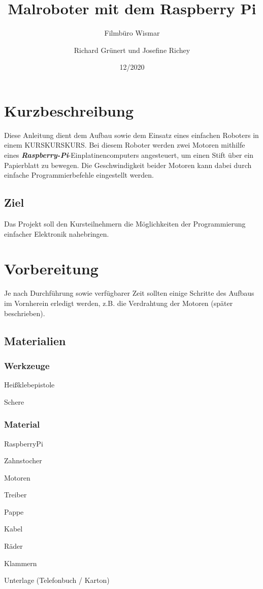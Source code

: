 \documentclass[12pt]{article}
\title{Malroboter mit dem Raspberry Pi}
\subtitle{Filmbüro Wismar}
\author{Richard Grünert und Josefine Richey}
\date{12/2020}
\let\oldemph\emph
\renewcommand{\emph}[1]{\textbf{\oldemph{#1}}}
\begin{document}
\maketitle

\tableofcontents

\pagebreak

\section{Kurzbeschreibung}
Diese Anleitung dient dem Aufbau sowie dem Einsatz eines einfachen Roboters in einem KURSKURSKURS. Bei diesem Roboter werden zwei Motoren mithilfe eines \emph{Raspberry-Pi}-Einplatinencomputers angesteuert, um einen Stift über ein  Papierblatt zu bewegen. Die Geschwindigkeit beider Motoren kann dabei durch einfache Programmierbefehle eingestellt werden.\\

\subsection{Ziel}
Das Projekt soll den Kursteilnehmern die Möglichkeiten der Programmierung einfacher Elektronik nahebringen.

\section{Vorbereitung}
Je nach Durchführung sowie verfügbarer Zeit sollten einige Schritte des Aufbaus im Vornherein erledigt werden, z.B. die Verdrahtung der Motoren (später beschrieben).\\

\subsection{Materialien}

\subsubsection{Werkzeuge}
\begin{checklist}
    \item Heißklebepistole
    \item Schere
\end{checklist}

\subsubsection{Material}
\begin{checklist}
    \item RaspberryPi
    \item Zahnstocher
    \item Motoren
    \item Treiber
    \item Pappe
    \item Kabel
    \item Räder
    \item Klammern
    \item Unterlage (Telefonbuch / Karton)
\end{checklist}
\end{document}

